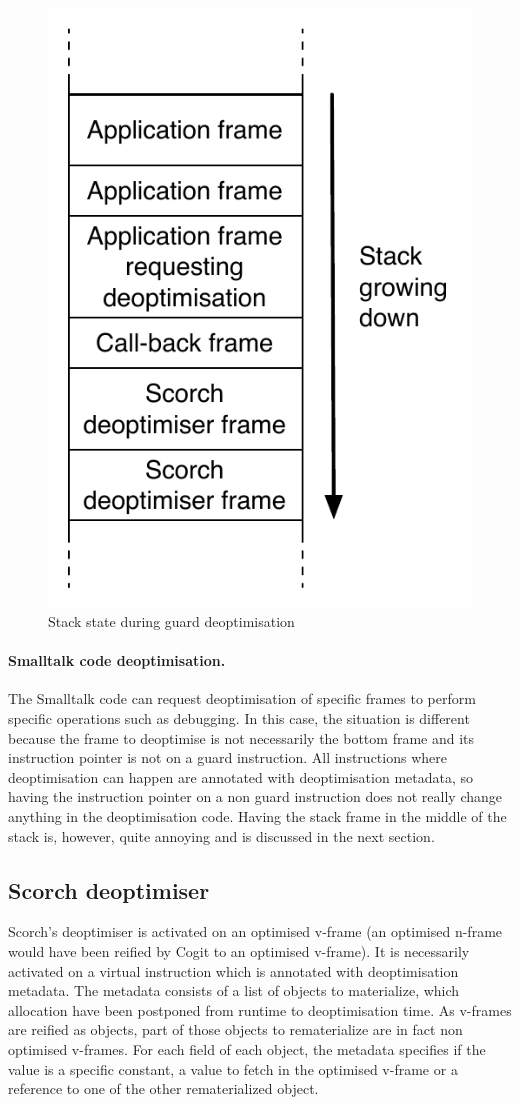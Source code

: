 \documentclass[a4paper,12pt,twoside]{../includes/ThesisStyle}
\begin{document}
\begin{figure}[h!]
    \begin{center}
        \includegraphics[width=0.4\linewidth]{DeoptCallBackStack}
        \caption{Stack state during guard deoptimisation}
        \label{fig:DeoptCallBackStack}
    \end{center}
\end{figure}


\paragraph{Smalltalk code deoptimisation.}The Smalltalk code can request deoptimisation of specific frames to perform specific operations such as debugging. In this case, the situation is different because the frame to deoptimise is not necessarily the bottom frame and its instruction pointer is not on a guard instruction. All instructions where deoptimisation can happen are annotated with deoptimisation metadata, so having the instruction pointer on a non guard instruction does not really change anything in the deoptimisation code. Having the stack frame in the middle of the stack is, however, quite annoying and is discussed in the next section.


\subsection{Scorch deoptimiser}

Scorch's deoptimiser is activated on an optimised v-frame (an optimised n-frame would have been reified by Cogit to an optimised v-frame). It is necessarily activated on a virtual instruction which is annotated with deoptimisation metadata. The metadata consists of a list of objects to materialize, which allocation have been postponed from runtime to deoptimisation time. As v-frames are reified as objects, part of those objects to rematerialize are in fact non optimised v-frames. For each field of each object, the metadata specifies if the value is a specific constant, a value to fetch in the optimised v-frame or a reference to one of the other rematerialized object.
\end{document}
